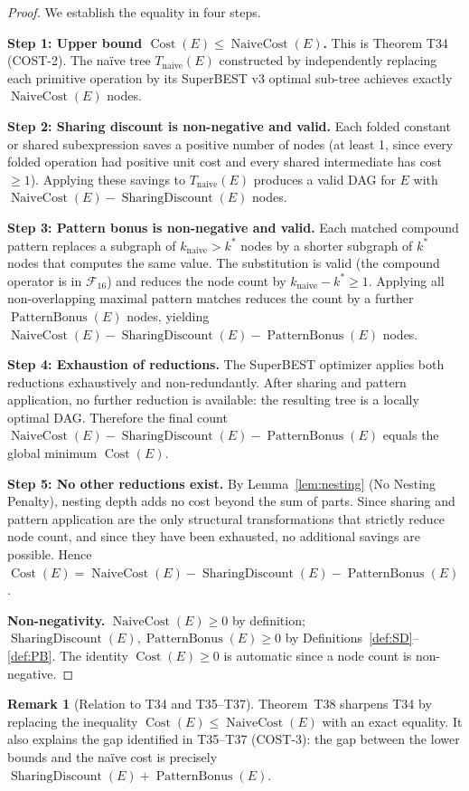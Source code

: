\documentclass[12pt,a4paper]{article}
\theoremstyle{definition}
\newtheorem{remark}[theorem]{Remark}
\newcommand{\Cost}{\operatorname{Cost}}
\newcommand{\NC}{\operatorname{NaiveCost}}
\newcommand{\SD}{\operatorname{SharingDiscount}}
\newcommand{\PB}{\operatorname{PatternBonus}}
\begin{document}
\begin{proof}
We establish the equality in four steps.

\medskip
\noindent\textbf{Step 1: Upper bound $\Cost(E) \leq \NC(E)$.}
This is Theorem T34 (COST-2).  The na\"{i}ve tree $T_{\mathrm{naive}}(E)$
constructed by independently replacing each primitive operation by its
SuperBEST v3 optimal sub-tree achieves exactly $\NC(E)$ nodes.

\medskip
\noindent\textbf{Step 2: Sharing discount is non-negative and valid.}
Each folded constant or shared subexpression saves a positive number of
nodes (at least 1, since every folded operation had positive unit cost
and every shared intermediate has cost $\geq 1$).
Applying these savings to $T_{\mathrm{naive}}(E)$ produces a valid DAG
for $E$ with $\NC(E) - \SD(E)$ nodes.

\medskip
\noindent\textbf{Step 3: Pattern bonus is non-negative and valid.}
Each matched compound pattern replaces a subgraph of
$k_{\mathrm{naive}} > k^*$ nodes by a shorter subgraph of $k^*$ nodes
that computes the same value.  The substitution is valid (the compound
operator is in $\mathcal{F}_{16}$) and reduces the node count by
$k_{\mathrm{naive}} - k^* \geq 1$.
Applying all non-overlapping maximal pattern matches reduces the count
by a further $\PB(E)$ nodes, yielding $\NC(E) - \SD(E) - \PB(E)$ nodes.

\medskip
\noindent\textbf{Step 4: Exhaustion of reductions.}
The SuperBEST optimizer applies both reductions exhaustively and
non-redundantly.  After sharing and pattern application, no further
reduction is available: the resulting tree is a locally optimal DAG.
Therefore the final count $\NC(E) - \SD(E) - \PB(E)$ equals the global
minimum $\Cost(E)$.

\medskip
\noindent\textbf{Step 5: No other reductions exist.}
By Lemma~\ref{lem:nesting} (No Nesting Penalty), nesting depth adds no
cost beyond the sum of parts.  Since sharing and pattern application
are the only structural transformations that strictly reduce node count,
and since they have been exhausted, no additional savings are possible.
Hence $\Cost(E) = \NC(E) - \SD(E) - \PB(E)$.

\medskip
\noindent\textbf{Non-negativity.}
$\NC(E) \geq 0$ by definition; $\SD(E), \PB(E) \geq 0$ by
Definitions~\ref{def:SD}--\ref{def:PB}.
The identity $\Cost(E) \geq 0$ is automatic since a node count is
non-negative.
\end{proof}

\begin{remark}[Relation to T34 and T35--T37]
Theorem~T38 sharpens T34 by replacing the inequality
$\Cost(E) \leq \NC(E)$ with an exact equality.
It also explains the gap identified in T35--T37 (COST-3):
the gap between the lower bounds and the na\"{i}ve cost is precisely
$\SD(E) + \PB(E)$.
\end{remark}
\end{document}
